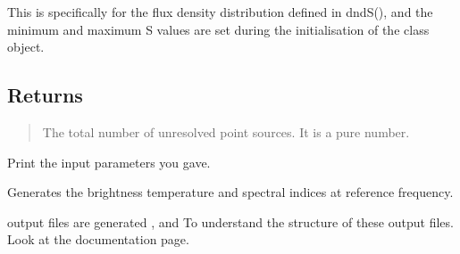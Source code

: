 \documentclass[letterpaper,10pt,english]{sphinxmanual}
\begin{document}
\begin{fulllineitems}
\begin{fulllineitems}
\sphinxAtStartPar
This is specifically for the flux density distribution defined in dndS(),
and the minimum and maximum S values are set during the initialisation of the class object.


\subsection{Returns}
\label{\detokenize{api:id5}}\begin{quote}

\sphinxAtStartPar
The total number of unresolved point sources. It is a pure number.
\end{quote}

\end{fulllineitems}


\begin{fulllineitems}
\label{\detokenize{api:furs.furs.print_input}}
\pysigstartsignatures
{}
\pysigstopsignatures
\sphinxAtStartPar
Print the input parameters you gave.

\end{fulllineitems}


\begin{fulllineitems}
\label{\detokenize{api:furs.furs.ref_freq}}
\pysigstartsignatures
{}
\pysigstopsignatures
\sphinxAtStartPar
Generates the brightness temperature and spectral indices at reference frequency.

 output files are generated ,  and 
To understand the structure of these output files. Look at the documentation page.

\end{fulllineitems}



\end{fulllineitems}
\end{document}
